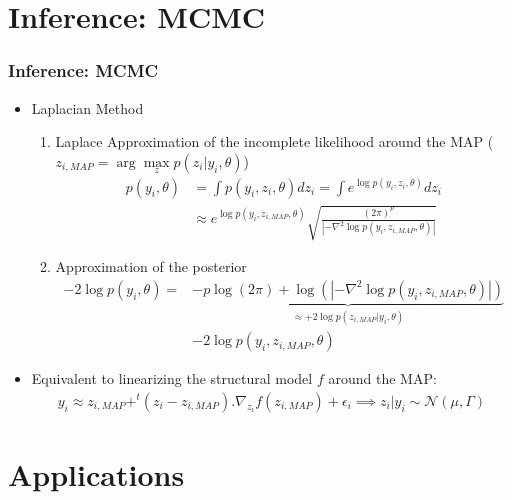 \documentclass[xcolor={dvipsnames}]{beamer}
\begin{document}
\section{Inference: MCMC}

\begin{frame}
\frametitle{Inference: MCMC}

\begin{itemize}
\item Laplacian Method
  \begin{enumerate}
    \item Laplace Approximation of the incomplete likelihood around the MAP ($z_{i,MAP} = \arg \max \limits_{z} p(z_i|y_i,\theta)$)
    \begin{align}
    p(y_i,\theta) & = \int{p(y_i,z_i,\theta) dz_i} = \int{e^{\log p(y_i,z_i,\theta)} dz_i}\\
    & \approx e^{\log p(y_i,z_{i,MAP},\theta)} \sqrt{\frac{(2\pi)^p}{|-\nabla^2\log p(y_i,z_{i,MAP},\theta)|}}
    \end{align}
    \item Approximation of the posterior
    \begin{align}
    -2 \log p(y_i,\theta) = & \underbrace{-p \log(2\pi) +\log(|-\nabla^2\log p(y_i,z_{i,MAP},\theta)|)}_{\approx +2\log p(z_{i,MAP}|y_i,\theta)} \\
    & -2\log p(y_i,z_{i,MAP},\theta)
    \end{align}
  \end{enumerate} 
\item Equivalent to linearizing the structural model $f$ around the MAP:
\begin{align}
y_i \approx z_{i,MAP} + ^{t}(z_i - z_{i,MAP}).\nabla_{z_i} f(z_{i,MAP}) + \epsilon_i \implies z_i|y_i \sim \mathcal{N}(\mu, \Gamma)
\end{align}



\end{itemize}

\end{frame}




\section{Applications}
\end{document}
